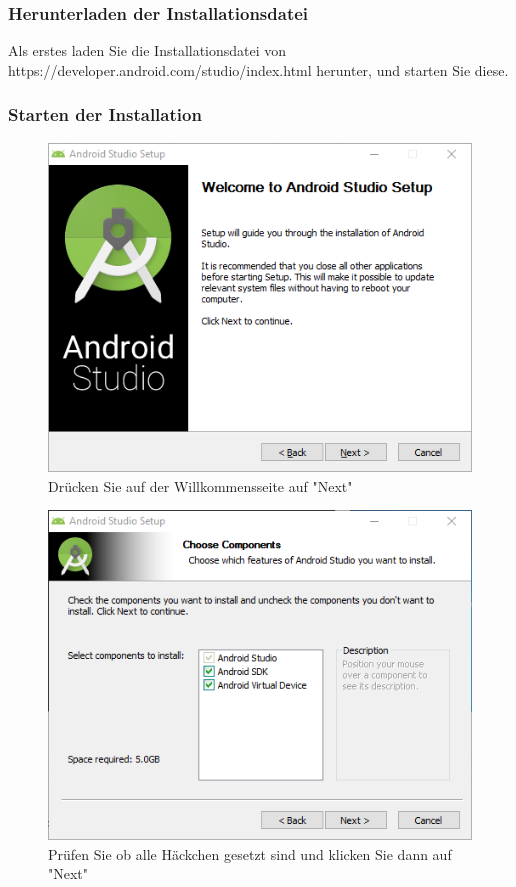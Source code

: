 \documentclass[a4paper,10pt,xetex]{article}
\begin{document}
\subsubsection{Herunterladen der Installationsdatei}
Als erstes laden Sie die Installationsdatei von https://developer.android.com/studio/index.html herunter, und starten Sie diese.
\subsubsection{Starten der Installation}

\begin{figure}
  \centering
  \includegraphics[width=\textwidth]{Installation/1-1}
  \caption{Drücken Sie auf der Willkommensseite auf "Next"}
\end{figure}

\begin{figure}
  \centering
  \includegraphics[width=\textwidth]{Installation/1-2}
  \caption{Prüfen Sie ob alle Häckchen gesetzt sind und klicken Sie dann auf "Next"}
\end{figure}
\end{document}
